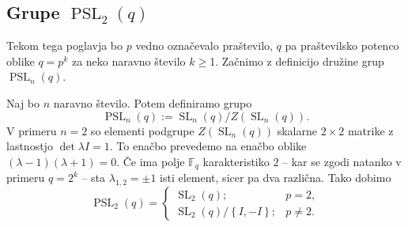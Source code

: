 \subsection{Grupe $\operatorname{PSL}_{2}(q)$}\label{sec_grupe_psl2q}

Tekom tega poglavja bo $p$ vedno označevalo praštevilo, $q$ pa praštevilsko potenco oblike $q = p^{k}$ za neko naravno število $k \ge $1. Začnimo z definicijo družine grup $\operatorname{PSL}_n(q)$.

\begin{definicija}\label{def_pslnq_in_psl2q}
    Naj bo $n$ naravno število. Potem definiramo grupo \begin{equation*}
        \operatorname{PSL}_n(q) := {\operatorname{SL}_n(q)} / {Z(\operatorname{SL}_n(q))}.
     \end{equation*}   
    V primeru $n = 2$ so elementi podgrupe $Z(\operatorname{SL}_n(q))$ skalarne $2 \times 2$ matrike z lastnostjo $\det \lambda I = 1$. To enačbo prevedemo na enačbo oblike $(\lambda - 1)(\lambda + 1) = 0$.
    Če ima polje $\mathbb{F}_q$ karakteristiko $2$ -- kar se zgodi natanko v primeru $q = 2^{k}$ -- sta $\lambda_{1,2} = \pm 1$ isti element, sicer pa dva različna. Tako dobimo
    \begin{equation*}
                \operatorname{PSL}_2(q) = \begin{cases}
                    \operatorname{SL}_2(q); & p = 2,  \\
                    {\operatorname{SL}_2(q)} / {\left\{ I, -I \right\} }; & p \neq 2.
                \end{cases}
             \end{equation*}   
    \end{definicija}
    
